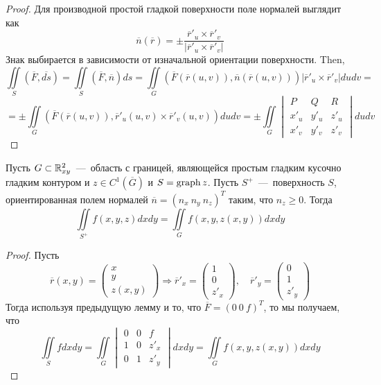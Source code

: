 \begin{proof}
    Для производной простой гладкой поверхности поле нормалей выглядит как \[\overline{n}(\overline{r}) = \pm\dfrac{\overline{r}'_u \times \overline{r}'_v}{|\overline{r}'_u \times \overline{r}'_v|}\]
    Знак выбирается в зависимости от изначальной ориентации поверхности. Then, \[
    \iint\limits_S (\overline{F}, \overline{ds}) = \iint\limits_{S}(\overline{F}, \overline{n})ds = \iint\limits_G (\overline{F}(\overline{r}(u, v)), \overline{n}(\overline{r}(u, v)))|\overline{r}'_u \times \overline{r}'_v|dudv = \]\[ =  \pm\iint\limits_G (\overline{F}(\overline{r}(u, v)), \overline{r}'_u(u, v) \times \overline{r}'_v(u, v))dudv = \pm \iint\limits_G \begin{vmatrix}
        P & Q & R \\ x'_u & y'_u & z'_u \\ x'_v & y'_v & z'_v
    \end{vmatrix} dudv
    \]
\end{proof}
\hypertarget{graph_gaus}{}
\begin{theorem}
    Пусть $G \subset \mathbb{R}^2_{xy}$~---~область с границей, являющейся простым гладким кусочно гладким контуром и $z \in C^1(\overline{G})$ и $S = \operatorname{graph} z$. Пусть $S^+$~---~поверхность $S$, ориентированная полем нормалей $\overline{n} = (n_x \  n_y \  n_z)^T$ таким, что $n_z \geq 0$. Тогда \[
    \iint\limits_{S^+} f(x, y, z)dxdy = \iint\limits_G f(x, y, z(x, y))dxdy
    \]
\end{theorem}
\begin{proof}
    Пусть \begin{equation*}
        \overline{r}(x, y) = \begin{pmatrix}
            x \\ y \\ z(x, y)
        \end{pmatrix} \Rightarrow \overline{r}'_x = \begin{pmatrix}
            1 \\ 0 \\ z'_x
        \end{pmatrix}, \quad \overline{r}'_y = \begin{pmatrix}
            0 \\ 1 \\ z'_y
        \end{pmatrix}
    \end{equation*}
    Тогда используя предыдущую лемму и то, что $\overline{F} = (0 \ 0 \ f)^T$, то мы получаем, что \[
    \iint\limits_S fdxdy = \iint\limits_G \begin{vmatrix}
        0 & 0 & f \\ 1 & 0 & z'_x \\ 0 & 1 & z'_y
    \end{vmatrix}dxdy =  \iint\limits_G f(x, y, z(x, y))dxdy
    \]
\end{proof}

